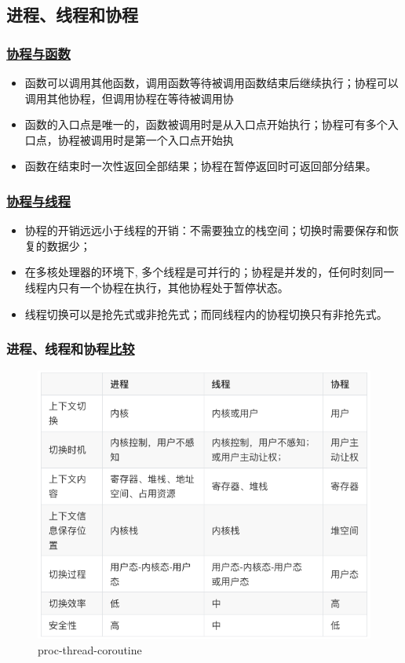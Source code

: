 \subsection{进程、线程和协程}
% 
\begin{frame}[fragile]
    \frametitle{\href{https://zh.wikipedia.org/wiki/\%E5\%8D\%8F\%E7\%A8\%8B}{协程与函数}}

    \begin{itemize}
        \item 函数可以调用其他函数，调用函数等待被调用函数结束后继续执行；协程可以调用其他协程，但调用协程在等待被调用协%
        \item 函数的入口点是唯一的，函数被调用时是从入口点开始执行；协程可有多个入口点，协程被调用时是第一个入口点开始执%
        \item 函数在结束时一次性返回全部结果；协程在暂停返回时可返回部分结果。
    \end{itemize}

% 

\end{frame}
\begin{frame}[fragile]
    \frametitle{\href{https://www.cnblogs.com/theRhyme/p/14061698.html}{协程与线程}}

    \begin{itemize}
        \item 协程的开销远远小于线程的开销：不需要独立的栈空间；切换时需要保存和恢复的数据少；
        \item 在多核处理器的环境下, 多个线程是可并行的；协程是并发的，任何时刻同一线程内只有一个协程在执行，其他协程处于暂停状态。
        \item 线程切换可以是抢先式或非抢先式；而同线程内的协程切换只有非抢先式。
    \end{itemize}

% 

\end{frame}
\begin{frame}[fragile]
    \frametitle{进程、线程和协程\href{https://www.cnblogs.com/theRhyme/p/14061698.html}{比较}}
% 
	\begin{figure}
		\centering
		\includegraphics[width=0.2\linewidth]{figs/proc-thread-coroutine.png}
		\caption{proc-thread-coroutine}
	\end{figure}
\end{frame}

